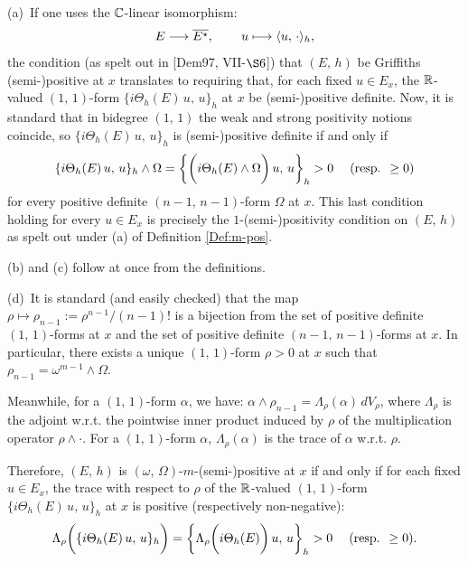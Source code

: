 \documentclass[12pt]{article}
\begin{document}
 (a)\, If one uses the $\mathbb{C}$-linear isomorphism: \begin{eqnarray*}E\longrightarrow\overline{E^\star}, \hspace{5ex} u\longmapsto\langle u,\,\cdot\rangle_h,\end{eqnarray*} the condition (as spelt out in [Dem97, VII-$\S6$]) that $(E,\,h)$ be Griffiths (semi-)positive at $x$ translates to requiring that, for each fixed $u\in E_x$, the $\mathbb{R}$-valued $(1,\,1)$-form $\{i\Theta_h(E)\,u,\,u\}_h$ at $x$ be (semi-)positive definite. Now, it is standard that in bidegree $(1,\,1)$ the weak and strong positivity notions coincide, so $\{i\Theta_h(E)\,u,\,u\}_h$ is (semi-)positive definite if and only if \begin{eqnarray*}\{i\Theta_h(E)\,u,\,u\}_h\wedge\Omega = \bigg\{\bigg(i\Theta_h(E)\wedge\Omega\bigg)\,u,\,u\bigg\}_h >0 \hspace{3ex} (\mbox{resp.} \hspace{1ex} \geq 0)\end{eqnarray*} for every positive definite $(n-1,\,n-1)$-form $\Omega$ at $x$. This last condition holding for every $u\in E_x$ is precisely the $1$-(semi-)positivity condition on $(E,\,h)$ as spelt out under (a) of Definition \ref{Def:m-pos}.

(b) and (c) follow at once from the definitions.

(d)\, It is standard (and easily checked) that the map $\rho\mapsto\rho_{n-1}:=\rho^{n-1}/(n-1)!$ is a bijection from the set of positive definite $(1,\,1)$-forms at $x$ and the set of positive definite $(n-1,\,n-1)$-forms at $x$. In particular, there exists a unique $(1,\,1)$-form $\rho>0$ at $x$ such that $\rho_{n-1} = \omega^{m-1}\wedge\Omega$.

Meanwhile, for a $(1,\,1)$-form $\alpha$, we have: $\alpha\wedge\rho_{n-1} = \Lambda_\rho(\alpha)\,dV_\rho$, where $\Lambda_\rho$ is the adjoint w.r.t. the pointwise inner product induced by $\rho$ of the multiplication operator $\rho\wedge\cdot$. For a $(1,\,1)$-form $\alpha$, $\Lambda_\rho(\alpha)$ is the trace of $\alpha$ w.r.t. $\rho$. 

Therefore, $(E,\,h)$ is $(\omega,\,\Omega)$-$m$-(semi-)positive at $x$ if and only if for each fixed $u\in E_x$, the trace with respect to $\rho$ of the $\mathbb{R}$-valued $(1,\,1)$-form $\{i\Theta_h(E)\,u,\,u\}_h$ at $x$ is positive (respectively non-negative): \begin{eqnarray*}\Lambda_\rho\bigg(\{i\Theta_h(E)\,u,\,u\}_h\bigg) = \bigg\{\Lambda_\rho\bigg(i\Theta_h(E)\bigg)\,u,\,u\bigg\}_h > 0  \hspace{3ex} (\mbox{resp.} \hspace{1ex} \geq 0).\end{eqnarray*}
\end{document}
